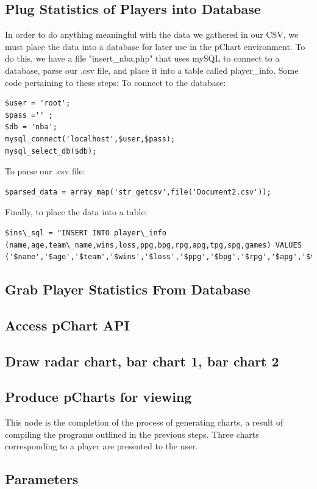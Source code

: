 \documentclass[journal]{vgtc}                %
\begin{document}
\subsection{Plug Statistics of Players into Database}
In order to do anything meaningful with the data we gathered in our CSV, we must place the data into a database for later use in the pChart environment. To do this, we have a file "insert\_nba.php" that uses mySQL to connect to a database, parse our .csv file, and place it into a table called player\_info. Some code pertaining to these steps:
To connect to the database:
\begin{lstlisting}
$user = 'root';
$pass ='' ; 
$db = 'nba';
mysql_connect('localhost',$user,$pass);
mysql_select_db($db);
\end{lstlisting}
To parse our .csv file:
\begin{lstlisting}
$parsed_data = array_map('str_getcsv',file('Document2.csv'));
\end{lstlisting}
Finally, to place the data into a table:
\begin{lstlisting}
$ins\_sql = "INSERT INTO player\_info (name,age,team\_name,wins,loss,ppg,bpg,rpg,apg,tpg,spg,games) VALUES ('$name','$age','$team','$wins','$loss','$ppg','$bpg','$rpg','$apg','$tpg','$spg','$games')";

\end{lstlisting}

\subsection{Grab Player Statistics From Database}
\subsection{Access pChart API}
\subsection{Draw radar chart, bar chart 1, bar chart 2}
\subsection{Produce pCharts for viewing}
This node is the completion of the process of generating charts, a result of compiling the programs outlined in the previous steps. Three charts corresponding to a player are presented to the user.
\subsection{Parameters}
\end{document}
